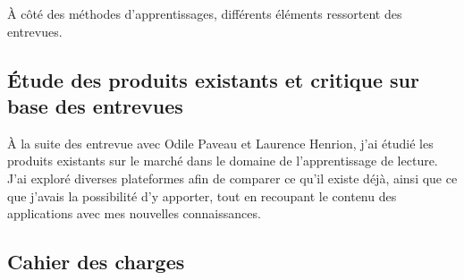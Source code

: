 À côté des méthodes d'apprentissages, différents éléments ressortent des entrevues.  

\subsection{Étude des produits existants et critique sur base des entrevues}
À la suite des entrevue avec Odile Paveau et Laurence Henrion, j'ai étudié les produits existants sur le marché dans le domaine de l'apprentissage de lecture. J'ai exploré diverses plateformes afin de comparer ce qu'il existe déjà, ainsi que ce que j'avais la possibilité d'y apporter, tout en recoupant le contenu des applications avec mes nouvelles connaissances.

\subsection{Cahier des charges}